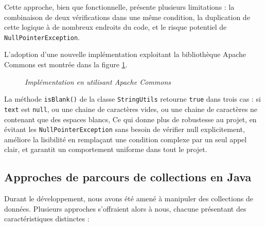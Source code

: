 \documentclass[12pt,a4paper]{report}
\begin{document}
	Cette approche, bien que fonctionnelle, présente plusieurs limitations : la combinaison de deux vérifications dans une même condition, la duplication de cette logique à de nombreux endroits du code, et le risque potentiel de \verb|NullPointerException|.
	
	L'adoption d'une nouvelle implémentation exploitant la bibliothèque Apache Commons est montrée dans la figure \ref{fig:after-string-utils}.
	
	\begin{figure}[H]
		\centering
		\caption{\textit{Implémentation en utilisant Apache Commons}}
		\label{fig:after-string-utils}
	\end{figure}
	
	La méthode \verb|isBlank()| de la classe \verb|StringUtils| retourne \verb|true| dans trois cas : si \verb|text| est \verb|null|, ou une chaine de caractères vides, ou une chaine de caractères ne contenant que des espaces blancs, Ce qui donne plus de robustesse au projet, en évitant les \verb|NullPointerException| sans besoin de vérifier null explicitement, améliore la lisibilité en remplaçant une condition complexe par un seul appel clair, et garantit un comportement uniforme dans tout le projet.
	
	\subsection{Approches de parcours de collections en Java}
	
	Durant le développement, nous avons été amené à manipuler des collections de données. Plusieurs approches s'offraient alors à nous, chacune présentant des caractéristiques distinctes :
	
\end{document}
